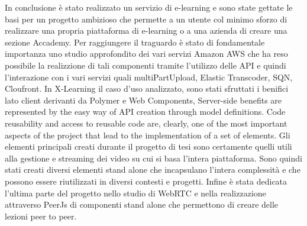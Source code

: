 In conclusione è stato realizzato un servizio di e-learning e sono state gettate le basi per un progetto ambizioso che permette a un utente col minimo sforzo di realizzare una propria piattaforma di e-learning o a una azienda di creare una sezione Accademy.
Per raggiungere il traguardo è stato di fondamentale importanza uno studio approfondito dei vari servizi Amazon AWS che ha reso possibile la realizzione di tali componenti tramite l'utilizzo delle API e quindi l'interazione con i vari servizi quali multiPartUpload, Elastic Transcoder, SQN, Cloufront.
In X-Learning il caso d'uso analizzato, sono stati sfruttati i benifici lato client derivanti da Polymer e Web Components, Server-side benefits are represented by the easy way of API creation through model definitions.
Code reusability and access to reusable code are, clearly, one of the most important aspects of the project that lead to the implementation of a set of elements.
Gli elementi principali creati durante il progetto di tesi sono certamente quelli utili alla gestione e streaming dei video su cui si basa l'intera piattaforma.
Sono quindi stati creati diversi elementi stand alone che incapsulano l'intera complessità e che possono essere riutilizzati in diversi contesti e progetti.
Infine è stata dedicata l'ultima parte del progetto nello studio di WebRTC e nella realizzazione attraverso PeerJs di componenti stand alone che permettono di creare delle lezioni peer to peer.
